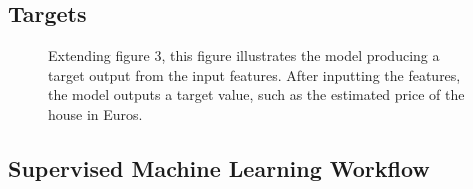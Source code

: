 \documentclass[12pt]{article}
\begin{document}
\subsection{Targets}

\begin{figure}[H]
\centering
{}
    \caption{Extending figure 3, this figure illustrates the model producing a target output from the input features. After inputting the features, the model outputs a target value, such as the estimated price of the house in Euros.}
    \label{fig:regression_example}
\end{figure}

\subsection{Supervised Machine Learning Workflow}
\end{document}

